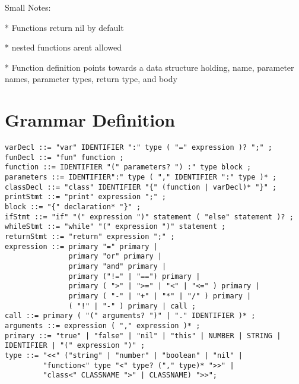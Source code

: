 \documentclass{article}
\begin{document}
Small Notes:

* Functions return nil by default

* nested functions arent allowed

* Function definition points towards a data structure holding, name, parameter names, parameter types, return type, and body

\section*{Grammar Definition}

\begin{lstlisting}[mathescape]
varDecl ::= "var" IDENTIFIER ":" type ( "=" expression )? ";" ;
funDecl ::= "fun" function ;
function ::= IDENTIFIER "(" parameters? ") :" type block ;
parameters ::= IDENTIFIER":" type ( "," IDENTIFIER ":" type )* ;
classDecl ::= "class" IDENTIFIER "{" (function | varDecl)* "}" ;
printStmt ::= "print" expression ";" ;
block ::= "{" declaration* "}" ;
ifStmt ::= "if" "(" expression ")" statement ( "else" statement )? ;
whileStmt ::= "while" "(" expression ")" statement ;
returnStmt ::= "return" expression ";" ;
expression ::= primary "=" primary |
               primary "or" primary |
               primary "and" primary |
               primary ("!=" | "==") primary |
               primary ( ">" | ">=" | "<" | "<=" ) primary |
               primary ( "-" | "+" | "*" | "/" ) primary |
               ( "!" | "-" ) primary | call ;
call ::= primary ( "(" arguments? ")" | "." IDENTIFIER )* ;
arguments ::= expression ( "," expression )* ;
primary ::= "true" | "false" | "nil" | "this" | NUMBER | STRING | IDENTIFIER | "(" expression ")" ;
type ::= "<<" ("string" | "number" | "boolean" | "nil" |
         "function<" type "<" type? ("," type)* ">>" |
         "class<" CLASSNAME ">" | CLASSNAME) ">>";
\end{lstlisting}
\end{document}
